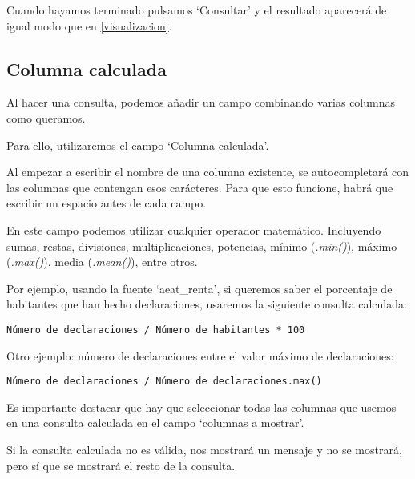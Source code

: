 
Cuando hayamos terminado pulsamos `Consultar' y el resultado aparecerá de igual modo que en \ref{visualizacion}.

\subsection{Columna calculada} \label{calculada}

Al hacer una consulta, podemos añadir un campo combinando varias columnas como queramos.

Para ello, utilizaremos el campo `Columna calculada'.

Al empezar a escribir el nombre de una columna existente, se autocompletará con las columnas que contengan esos carácteres. Para que esto funcione, habrá que escribir un espacio antes de cada campo.


En este campo podemos utilizar cualquier operador matemático. Incluyendo sumas, restas, divisiones, multiplicaciones, potencias, mínimo (\textit{.min()}), máximo (\textit{.max()}), media (\textit{.mean()}), entre otros.

Por ejemplo, usando la fuente `aeat\_renta', si queremos saber el porcentaje de habitantes que han hecho declaraciones, usaremos la siguiente consulta calculada:

\begin{lstlisting}
Número de declaraciones / Número de habitantes * 100
\end{lstlisting}



Otro ejemplo: número de declaraciones entre el valor máximo de declaraciones:

\begin{lstlisting}
Número de declaraciones / Número de declaraciones.max()
\end{lstlisting}

Es importante destacar que hay que seleccionar todas las columnas que usemos en una consulta calculada en el campo `columnas a mostrar'.

Si la consulta calculada no es válida, nos mostrará un mensaje y no se mostrará, pero sí que se mostrará el resto de la consulta.


